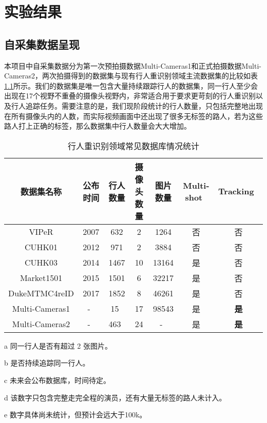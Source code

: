 \chapter{实验结果}\label{sec:experiment}

\section{自采集数据呈现}

本项目中自采集数据分为第一次预拍摄数据Multi-Cameras1和正式拍摄数据Multi-Cameras2，两次拍摄得到的数据集与现有行人重识别领域主流数据集的比较如表\ref{tab:reiddataset}所示。我们的数据集是唯一包含大量持续跟踪行人的数据集，同一行人至少会出现在17个视野不重叠的摄像头视野内，非常适合用于要求更苛刻的行人重识别以及行人追踪任务。需要注意的是，我们现阶段统计的行人数量，只包括完整地出现在所有摄像头内的人数，而实际视频画面中还出现了很多无标签的路人，若为这些路人打上正确的标签，那么数据集中行人数量会大大增加。

\begin{table}[!htb]
\centering
\caption{行人重识别领域常见数据库情况统计}
\label{tab:reiddataset}
\begin{threeparttable}
\begin{tabularx}{\textwidth}{ccccccc}
\toprule
数据集名称   & 公布时间 & 行人数量 & 摄像头数量 & 图片数量  & Multi-shot~\tnote{a} & Tracking~\tnote{b} \\ \midrule
VIPeR\cite{gray2007evaluating}  & 2007 & 632  & 2     & 1264  & 否  & 否 \\
CUHK01\cite{li2012human} & 2012 & 971  & 2     & 3884  & 否  & 否 \\
CUHK03\cite{li2014deepreid} & 2014 & 1467 & 10    & 13164 & 是  & 否 \\
Market1501\cite{zheng2015scalable} & 2015 & 1501 & 6     & 32217 & 是  & 否 \\
DukeMTMC4reID\cite{gou2017dukemtmc4reid}  & 2017 & 1852 & 8     & 46261 & 是  & 否 \\
Multi-Cameras1 &  -~\tnote{c}   & 15~\tnote{d}   & 17     & 98543 & 是  & \textbf{是} \\
Multi-Cameras2 &  -~\tnote{c}   & 463~\tnote{d} & 24     & -~\tnote{e} & 是  & \textbf{是} \\
\bottomrule
\end{tabularx}
\begin{tablenotes}
    \footnotesize
    \item[a] 同一行人是否有超过 2 张图片。
    \item[b] 是否持续追踪同一行人。
    \item[c] 未来会公布数据库，时间待定。
    \item[d] 该数字只包含完整走完全程的演员，还有大量无标签的路人未计入。
    \item[e] 数字具体尚未统计，但预计会远大于100k。
\end{tablenotes}
\end{threeparttable}
\end{table}

